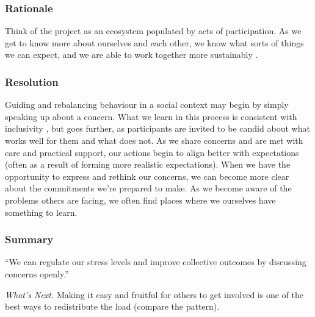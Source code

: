 \subsubsection*{Rationale}

Think of the project as an ecosystem populated by acts of participation.  As we get to know more about ourselves and each other, we know what sorts of things we can expect, and we are able to work together more sustainably \cite{ostrom2010revising}.

\subsubsection*{Resolution}

Guiding and rebalancing behaviour in a social context may begin by simply speaking up about a concern.  What we learn in this process is  consistent with inclusivity \cite{garrison2013toward}, but goes further, as participants are invited to be candid about what works well for them and what does not.
%
As we share concerns and are met with care and practical support, our actions begin to align better with expectations (often as a result of forming more realistic expectations).  When we have the opportunity to express and rethink our concerns, we can become more clear about the commitments we're prepared to make.  As we become aware of the problems others are facing, we often find places where we ourselves have something to learn.

\subsubsection*{Summary}
``We can regulate our stress levels and improve collective outcomes by discussing concerns openly.''

\begin{framed}
\noindent 
\emph{What's Next.}  Making it easy and fruitful for others to get involved is one of the best ways to redistribute the load (compare the
 pattern).
\end{framed}

